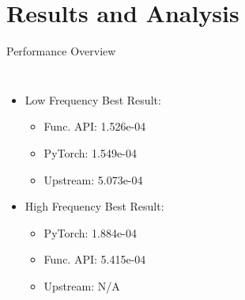 \documentclass{beamer}
\begin{document}
\section{Results and Analysis}
\begin{frame}{Performance Overview}
    \begin{columns}
        \begin{itemize}
            \item Low Frequency Best Result:
            \begin{itemize}
                \item Func. API: 1.526e-04
                \item PyTorch: 1.549e-04
                \item Upstream: 5.073e-04
            \end{itemize}
            \item High Frequency Best Result:
            \begin{itemize}
                \item PyTorch: 1.884e-04
                \item Func. API: 5.415e-04
                \item Upstream: N/A
            \end{itemize}
        \end{itemize}
        

\end{columns}
\end{frame}
\end{document}
